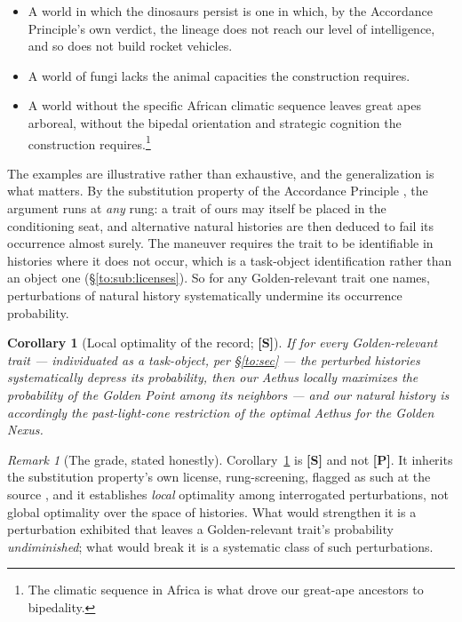 \documentclass[11pt]{article}
\numberwithin{equation}{section}
\theoremstyle{plain}
\newtheorem{corollary}[theorem]{Corollary}
\theoremstyle{definition}
\theoremstyle{remark}
\newtheorem{remark}[theorem]{Remark}
\begin{document}
\begin{itemize}\itemsep2pt
\item A world in which the dinosaurs persist is one in which, by the
Accordance Principle's own verdict, the lineage does not reach our
level of intelligence, and so does not build rocket vehicles.
\item A world of fungi lacks the animal capacities the construction
requires.
\item A world without the specific African climatic sequence leaves
great apes arboreal, without the bipedal orientation and strategic
cognition the construction requires.\footnote{The climatic sequence in
Africa is what drove our great-ape ancestors to bipedality.}
\end{itemize}

The examples are illustrative rather than exhaustive, and the
generalization is what matters. By the substitution property of the
Accordance Principle \cite{Nexus}, the argument runs at \emph{any}
rung: a trait of ours may itself be placed in the conditioning seat, and
alternative natural histories are then deduced to fail its occurrence
almost surely. The maneuver requires the trait to be identifiable in
histories where it does not occur, which is a task-object
identification rather than an object one
(\S\ref{to:sub:licenses}). So for any Golden-relevant trait one names,
perturbations
of natural history systematically undermine its occurrence probability.

\begin{corollary}[Local optimality of the record; \textbf{[S]}]
\label{gc:cor:localopt}
If for every Golden-relevant trait --- individuated as a task-object,
per \S\ref{to:sec} --- the perturbed histories systematically
depress its probability, then our Aethus locally maximizes the
probability of the Golden Point among its neighbors --- and our natural
history is accordingly the past-light-cone restriction of the optimal
Aethus for the Golden Nexus.
\end{corollary}

\begin{remark}[The grade, stated honestly]\label{gc:rem:grade}
Corollary~\ref{gc:cor:localopt} is \textbf{[S]} and not
\textbf{[P]}. It inherits the substitution property's own license, rung-screening, flagged as such at the source \cite{Ben26Optimal}, and it establishes \emph{local} optimality among interrogated
perturbations, not global optimality over the space of histories. What
would strengthen it is a perturbation exhibited that leaves a
Golden-relevant trait's probability \emph{undiminished}; what would
break it is a systematic class of such perturbations.
\end{remark}
\end{document}
